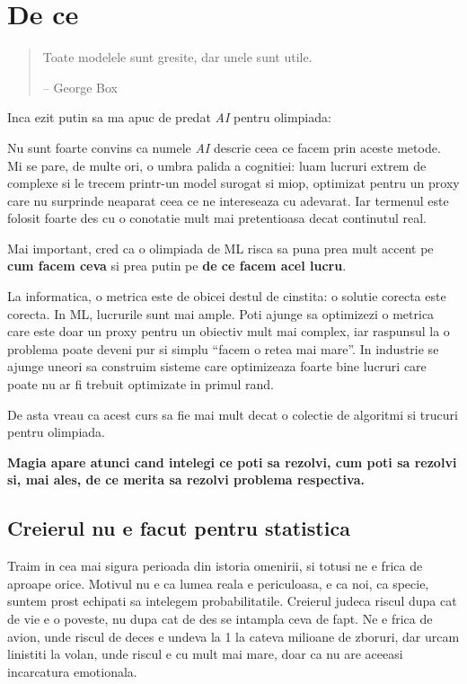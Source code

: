 \chapter*{De ce}

\begin{quote}
Toate modelele sunt gresite, dar unele sunt utile.

\begin{flushright}
-- George Box
\end{flushright}
\end{quote}

Inca ezit putin sa ma apuc de predat \textit{AI} pentru olimpiada:

Nu sunt foarte convins ca numele \textit{AI} descrie ceea ce facem prin
aceste metode. Mi se pare, de multe ori, o umbra palida a cognitiei: luam
lucruri extrem de complexe si le trecem printr-un model surogat si miop, optimizat
pentru un proxy care nu surprinde neaparat ceea ce ne intereseaza cu
adevarat. Iar termenul este folosit foarte des cu o conotatie mult mai
pretentioasa decat continutul real.

Mai important, cred ca o olimpiada de ML risca sa puna prea mult accent pe
\textbf{cum facem ceva} si prea putin pe \textbf{de ce facem acel lucru}.

La informatica, o metrica este de obicei destul de cinstita: o solutie
corecta este corecta. In ML, lucrurile sunt mai ample. Poti ajunge sa
optimizezi o metrica care este doar un proxy pentru un obiectiv mult mai
complex, iar raspunsul la o problema poate deveni pur si simplu ``facem o
retea mai mare''. In industrie se ajunge uneori sa construim sisteme care
optimizeaza foarte bine lucruri care poate nu ar fi trebuit optimizate in
primul rand.

De asta vreau ca acest curs sa fie mai mult decat o colectie de algoritmi
si trucuri pentru olimpiada.

\textbf{Magia apare atunci cand intelegi ce poti sa rezolvi, cum poti sa
rezolvi si, mai ales, de ce merita sa rezolvi problema respectiva.}

\section*{Creierul nu e facut pentru statistica}

Traim in cea mai sigura perioada din istoria omenirii, si totusi ne e
frica de aproape orice. Motivul nu e ca lumea reala e periculoasa, e ca
noi, ca specie, suntem prost echipati sa intelegem probabilitatile.
Creierul judeca riscul dupa cat de vie e o poveste, nu dupa cat de des se
intampla ceva de fapt. Ne e frica de avion, unde riscul de deces e undeva
la 1 la cateva milioane de zboruri, dar urcam linistiti la volan, unde
riscul e cu mult mai mare, doar ca nu are aceeasi incarcatura emotionala.

